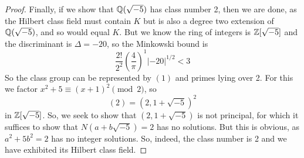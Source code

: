 \begin{proof}
	Finally, if we show that $\mathbb{Q}(\sqrt{-5})$ has class number 2, then we are done, as the Hilbert class field must contain $K$ but is also a degree two extension of $\mathbb{Q}(\sqrt{-5})$, and so would equal $K$. But we know the ring of integers is $\mathbb{Z}[\sqrt{-5}]$ and the discriminant is $\Delta = -20$, so the Minkowski bound is
	\[ \frac{2!}{2^2}\left(\frac4\pi\right)^1|-20|^{1/2} < 3 \]
	So the class group can be represented by $(1)$ and primes lying over 2. For this we factor $x^2+5 \equiv (x+1)^2 \pmod{2}$, so
	\[ (2) = (2,1+\sqrt{-5})^2 \]
	in $\mathbb{Z}[\sqrt{-5}]$. So, we seek to show that $(2,1+\sqrt{-5})$ is not principal, for which it suffices to show that $N(a+b\sqrt{-5}) = 2$ has no solutions. But this is obvious, as $a^2+5b^2 = 2$ has no integer solutions. So, indeed, the class number is 2 and we have exhibited its Hilbert class field.
\end{proof}
